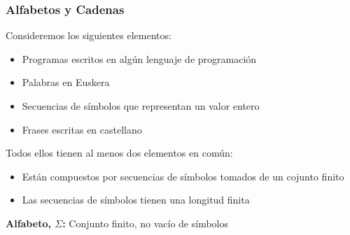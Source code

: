 \begin{frame}
  \frametitle{Alfabetos y Cadenas}
      \begin{block}{}
Consideremos los siguientes elementos:
\pause
\begin{itemize}[<+->]
\item Programas escritos en algún lenguaje de programación
\item Palabras en Euskera
\item Secuencias de símbolos que representan un valor entero
\item Frases escritas en castellano
\end{itemize}
      \end{block}
			\pause
      \begin{block}{Todos ellos tienen al menos dos elementos en común:}
\pause
\begin{itemize}[<+->]
\item Están compuestos por secuencias de símbolos tomados de un cojunto finito
\item Las secuencias de símbolos tienen una longitud finita
\end{itemize}
      \end{block}

\pause
\begin{defi}
\textbf{Alfabeto, $\Sigma$:}
Conjunto finito, no vacío de símbolos
\end{defi}
\end{frame}
